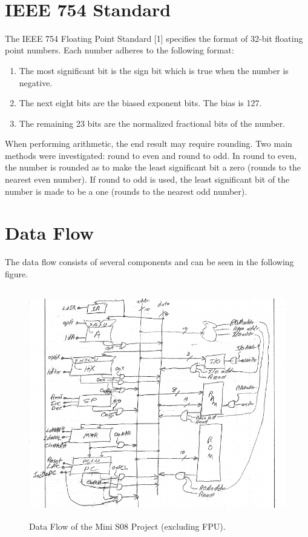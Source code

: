 \documentclass[letterpaper, 12pt]{article}
\begin{document}
\begin{flushleft}
~\newline
\section*{IEEE 754 Standard}
The IEEE 754 Floating Point Standard [1] specifies the format of 32-bit floating point numbers.  Each number adheres to the following format:
~\newline
\begin{enumerate}
	\item The most significant bit is the sign bit which is true when the number is negative.
	\item The next eight bits are the biased exponent bits. The bias is 127.
	\item The remaining 23 bits are the normalized fractional bits of the number.
\end{enumerate}

When performing arithmetic, the end result may require rounding.  Two main methods were investigated: round to even and round to odd.  In round to even, the number is rounded as to make the least significant bit a zero (rounds to the nearest even number).  If round to odd is used, the least significant bit of the number is made to be a one (rounds to the nearest odd number).

\newpage
\section*{Data Flow}

The data flow consists of several components and can be seen in the following figure.
 \begin{figure}[H]
 	\includegraphics[width=\linewidth,height=10cm,keepaspectratio]{dataflow.png}
 	\caption[Mini S08 Data Flow]{Data Flow of the Mini S08 Project (excluding FPU).}
 	\label{fig:arch}
 \end{figure}


\end{flushleft}
\end{document}
